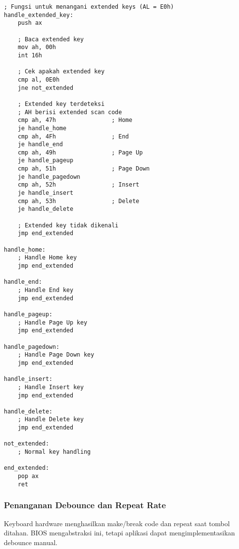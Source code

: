 \documentclass[../main.tex]{subfiles}
\begin{document}
\begin{lstlisting}[language={[x86masm]Assembler}, caption=Handler untuk Extended Keys, label={lst:extended-keys}]
; Fungsi untuk menangani extended keys (AL = E0h)
handle_extended_key:
    push ax
    
    ; Baca extended key
    mov ah, 00h
    int 16h
    
    ; Cek apakah extended key
    cmp al, 0E0h
    jne not_extended
    
    ; Extended key terdeteksi
    ; AH berisi extended scan code
    cmp ah, 47h                ; Home
    je handle_home
    cmp ah, 4Fh                ; End
    je handle_end
    cmp ah, 49h                ; Page Up
    je handle_pageup
    cmp ah, 51h                ; Page Down
    je handle_pagedown
    cmp ah, 52h                ; Insert
    je handle_insert
    cmp ah, 53h                ; Delete
    je handle_delete
    
    ; Extended key tidak dikenali
    jmp end_extended
    
handle_home:
    ; Handle Home key
    jmp end_extended
    
handle_end:
    ; Handle End key
    jmp end_extended
    
handle_pageup:
    ; Handle Page Up key
    jmp end_extended
    
handle_pagedown:
    ; Handle Page Down key
    jmp end_extended
    
handle_insert:
    ; Handle Insert key
    jmp end_extended
    
handle_delete:
    ; Handle Delete key
    jmp end_extended
    
not_extended:
    ; Normal key handling
    
end_extended:
    pop ax
    ret
\end{lstlisting}

\subsubsection{Penanganan Debounce dan Repeat Rate}
Keyboard hardware menghasilkan make/break code dan repeat saat tombol ditahan. BIOS mengabstraksi ini, tetapi aplikasi dapat mengimplementasikan debounce manual.
\end{document}
